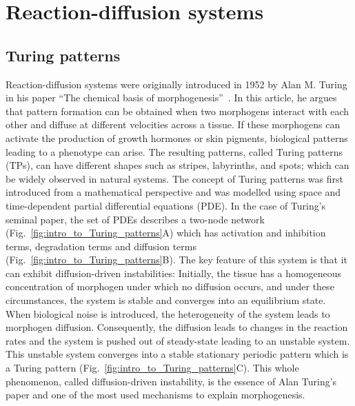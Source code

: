 

\section{Reaction-diffusion systems}
\subsection{Turing patterns}
Reaction-diffusion systems were originally introduced in 1952 by Alan M. Turing in his paper “The chemical basis of morphogenesis”~\parencite{Turing1952}.
In this article, he argues that pattern formation can be obtained when two morphogens interact with each other and diffuse at different
velocities across a tissue.
If these morphogens can activate the production of growth hormones or skin pigments, biological patterns leading to a phenotype can arise.
The resulting patterns, called Turing patterns (TPs), can have different shapes such as stripes, labyrinths, and spots; which can be widely observed in natural systems.
The concept of Turing patterns was first introduced from a mathematical perspective and was modelled using space and time-dependent partial differential equations (PDE). In the case of Turing’s seminal paper, the set of PDEs describes a two-node network (Fig.~\ref{fig:intro_to_Turing_patterns}A) which has activation and inhibition terms, degradation terms and diffusion terms (Fig.~\ref{fig:intro_to_Turing_patterns}B).
The key feature of this system is that it can exhibit diffusion-driven instabilities: Initially, the tissue has a homogeneous concentration of morphogen under which no diffusion occurs, and under these circumstances, the system is stable and converges into an equilibrium state.
When biological noise is introduced, the heterogeneity of the system leads to morphogen diffusion.
Consequently, the diffusion leads to changes in the reaction rates and the system is pushed out of steady-state leading to an unstable system.
This unstable system converges into a stable stationary periodic pattern which is a Turing pattern (Fig.~\ref{fig:intro_to_Turing_patterns}C).
This whole phenomenon, called diffusion-driven instability, is the essence of Alan Turing’s paper and one of the most used mechanisms to explain morphogenesis.

